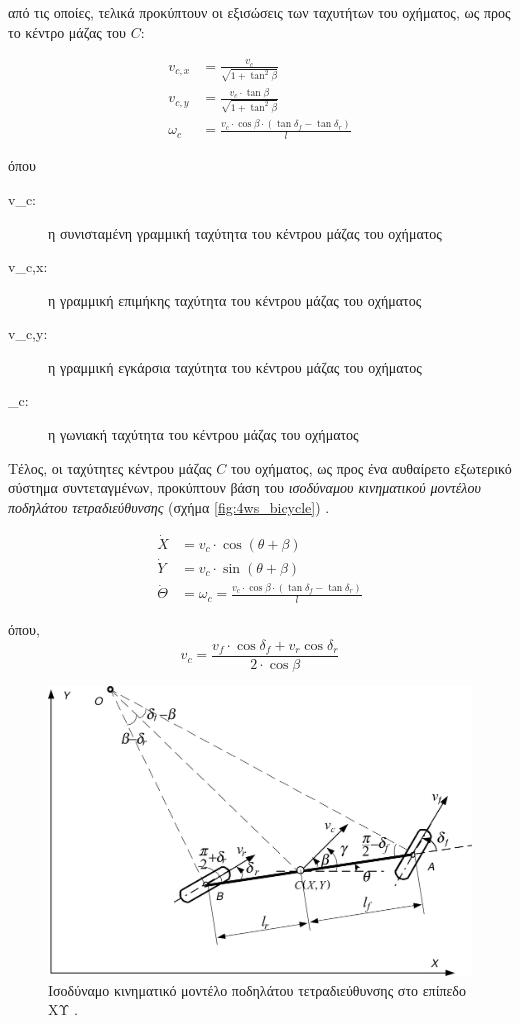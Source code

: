 \noindent
από τις οποίες, τελικά προκύπτουν οι εξισώσεις των ταχυτήτων του οχήματος, ως προς το κέντρο μάζας του $C$:

\begin{align}
	v_{c,x} &= \frac{v_c}{\sqrt{1+\tan^2\beta}}
	\label{eq:lin_vel_x}\\
	v_{c,y} &= \frac{v_c \cdot \tan{\beta}}{\sqrt{1+\tan^2\beta}}
	\label{eq:lin_vel_y}\\
	\omega_c &= \frac{v_c \cdot \cos{\beta} \cdot (\tan{\delta_f - \tan{\delta_r}})}{l}
	\label{eq:ang_vel}
\end{align}

\bigskip\noindent
όπου
\begin{description}
	\item[v_c:] η συνισταμένη γραμμική ταχύτητα του κέντρου μάζας του οχήματος
	\item[v_{c,x}:] η γραμμική επιμήκης ταχύτητα του κέντρου μάζας του οχήματος
	\item[v_{c,y}:] η γραμμική εγκάρσια ταχύτητα του κέντρου μάζας του οχήματος
	\item[\omega_c:] η γωνιακή ταχύτητα του κέντρου μάζας του οχήματος
\end{description}

\bigskip\bigskip
Τέλος, οι ταχύτητες κέντρου μάζας $C$ του οχήματος, ως προς ένα αυθαίρετο εξωτερικό σύστημα συντεταγμένων, προκύπτουν βάση του \textit{ισοδύναμου κινηματικού μοντέλου ποδηλάτου τετραδιεύθυνσης} (σχήμα \ref{fig:4ws_bicycle}) \cite{4ws_trajectory_planning}.

\begin{align}
	\dot X &= v_c \cdot \cos(\theta + \beta)
	\label{eq:x_dot}\\
	\dot Y &= v_c \cdot \sin(\theta + \beta)
	\label{eq:y_dot}\\
	\dot \Theta &= \omega_c = \frac{v_c \cdot \cos{\beta} \cdot (\tan{\delta_f - \tan{\delta_r}})}{l}
	\label{eq:th_dot}
\end{align}

\noindent
όπου,
\begin{equation}
	v_c = \frac{v_f \cdot \cos{\delta_f} + v_r \cos{\delta_r}}{2 \cdot \cos{\beta}}
	\label{eq:v_c_f_r}
\end{equation}

\begin{figure}[!ht]
	\centering
	\includegraphics[width=0.6\linewidth]{Chapters/Chapter2/Figures/4ws_xy_plane.png}
	\caption[Ισοδύναμο κινηματικό μοντέλο ποδηλάτου τετραδιεύθυνσης στο επίπεδο ΧΥ.]{Ισοδύναμο κινηματικό μοντέλο ποδηλάτου τετραδιεύθυνσης στο επίπεδο ΧΥ \cite{4ws_trajectory_planning}.}
	\label{fig:4ws_xy_plane}
\end{figure}

